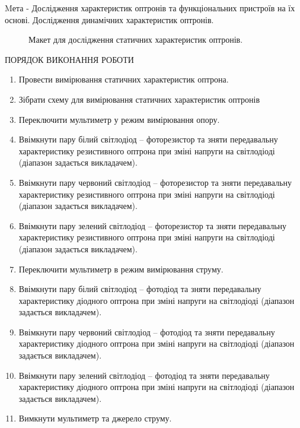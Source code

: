\documentclass[a4paper,14pt]{extreport}
\begin{document}
\newpage
\setcounter{page}{2}



Mета - Дослідження характеристик оптронів та функціональних пристроїв на їх
основі. Дослідження динамічних характеристик оптронів.\


 \begin{figure}[h!]
\caption{Макет для дослідження статичних характеристик оптронів.}
  
\end{figure}


\begin{center}
ПОРЯДОК ВИКОНАННЯ РОБОТИ
\end{center}
\begin{enumerate}
\item Провести вимірювання статичних характеристик оптрона.
\item  Зібрати схему для вимірювання статичних характеристик оптронів
\item  Переключити мультиметр у режим вимірювання опору.
\item  Ввімкнути пару білий світлодіод – фоторезистор та зняти передавальну
характеристику резистивного оптрона при зміні напруги на світлодіоді (діапазон
задається викладачем).
\item  Ввімкнути пару червоний світлодіод – фоторезистор та зняти
передавальну характеристику резистивного оптрона при зміні напруги на
світлодіоді (діапазон задається викладачем).
\item  Ввімкнути пару зелений світлодіод – фоторезистор та зняти
передавальну характеристику резистивного оптрона при зміні напруги на
світлодіоді (діапазон задається викладачем).
\item  Переключити мультиметр в режим вимірювання струму.
\item  Ввімкнути пару білий світлодіод – фотодіод та зняти передавальну
характеристику діодного оптрона при зміні напруги на світлодіоді (діапазон
задається викладачем).
\item  Ввімкнути пару червоний світлодіод – фотодіод та зняти передавальну
характеристику діодного оптрона при зміні напруги на світлодіоді (діапазон
задається викладачем).
\item  Ввімкнути пару зелений світлодіод – фотодіод та зняти передавальну
характеристику діодного оптрона при зміні напруги на світлодіоді (діапазон
задається викладачем).
\item  Вимкнути мультиметр та джерело струму.
\end{enumerate}
\end{document}
